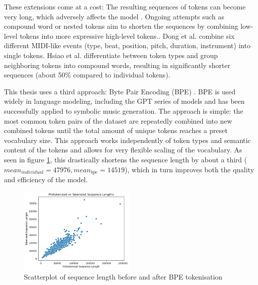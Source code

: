 These extensions come at a cost: The resulting sequences of tokens can become very long, which adversely affects the model \cite{Ji_Yang_Luo_survey_symbolic_2024}. Ongoing attempts such as compound word or nested tokens aim to shorten the sequences by combining low-level tokens into more expressive high-level tokens.\cite{Ryu_Dong_nested_2024}. Dong et al.\cite{Dong_Chen_MMT_Kirkpatrick_2023} combine six different MIDI-like events (type, beat, position, pitch, duration, instrument) into single tokens. Hsiao et al.\cite{compound_word_Hsiao_Liu_Yeh_Yang_2021} differentiate between token types and group neighboring tokens into compound words, resulting in significantly shorter sequences (about 50\% compared to individual tokens). 

This thesis uses a third approach: Byte Pair Encoding (BPE) \cite{Sennrich_Haddow_Birch_BPE_2016}. BPE is used widely in language modeling, including the GPT series of models\cite{Radford_Wu_Child_Luan_gpt2_2019} and has been successfully applied to symbolic music generation.\cite{Fradet_Gutowski_Chhel_Briot_2023} The approach is simple: the most common token pairs of the dataset are repeatedly combined into new combined tokens until the total amount of unique tokens reaches a preset vocabulary size. This approach works independently of token types and semantic content of the tokens and allows for very flexible scaling of the vocabulary. As seen in figure \ref{fig:tok_compare}, this drastically shortens the sequence length by about a third ($mean_{individual}=47976, mean_{bpe}=14519$), which in turn improves both the quality and efficiency of the model. 


\begin{figure}[H]
    \centering
    \includegraphics[width=0.5\textwidth]{IMAGES/scatter_pre_post_tok.png} 
    \caption{Scatterplot of sequence length before and after BPE tokenisation}
    \label{fig:tok_compare}
\end{figure}
